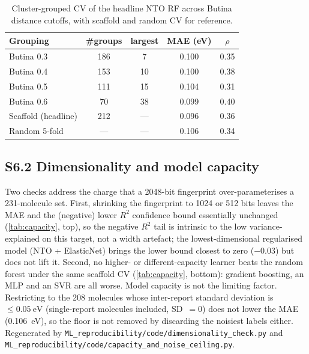 \documentclass[twoside,twocolumn,9pt]{extarticle}
\begin{document}
\begin{table}[htbp]
  \centering
  \caption{Cluster-grouped CV of the headline NTO RF across Butina distance cutoffs,
    with scaffold and random CV for reference.}
  \label{tab:clustercv}
  \footnotesize
  \begin{tabular}{lcccc}
    \toprule
    Grouping & \#groups & largest & MAE (eV) & $\rho$ \\
    \midrule
    Butina 0.3 & 186 & 7  & 0.100 & 0.35 \\
    Butina 0.4 & 153 & 10 & 0.100 & 0.38 \\
    Butina 0.5 & 111 & 15 & 0.104 & 0.31 \\
    Butina 0.6 & 70  & 38 & 0.099 & 0.40 \\
    \midrule
    Scaffold (headline) & 212 & --- & 0.096 & 0.36 \\
    Random 5-fold       & --- & --- & 0.106 & 0.34 \\
    \bottomrule
  \end{tabular}
\end{table}

\subsection*{S6.2 Dimensionality and model capacity}
Two checks address the charge that a \num{2048}-bit fingerprint over-parameterises a
\num{231}-molecule set. First, shrinking the fingerprint to \num{1024} or \num{512} bits
leaves the MAE and the (negative) lower $R^2$ confidence bound essentially unchanged
(\cref{tab:capacity}, top), so the negative $R^2$ tail is intrinsic to the low
variance-explained on this target, not a width artefact; the lowest-dimensional regularised
model (NTO + ElasticNet) brings the lower bound closest to zero ($-0.03$) but does not lift
it. Second, no higher- or different-capacity learner beats the random forest under the same
scaffold CV (\cref{tab:capacity}, bottom): gradient boosting, an MLP and an SVR are all
worse. Model capacity is not the limiting factor. Restricting to the \num{208} molecules
whose inter-report standard deviation is $\le\qty{0.05}{\electronvolt}$ (single-report
molecules included, SD~$=0$) does not lower the MAE (\qty{0.106}{\electronvolt}), so the
floor is not removed by discarding the noisiest labels either. Regenerated by \texttt{ML\_reproducibility/code/dimensionality\_check.py} and
\texttt{ML\_reproducibility/code/capacity\_and\_noise\_ceiling.py}.
\end{document}
